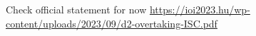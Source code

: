 Check official statement for now \url{https://ioi2023.hu/wp-content/uploads/2023/09/d2-overtaking-ISC.pdf}
